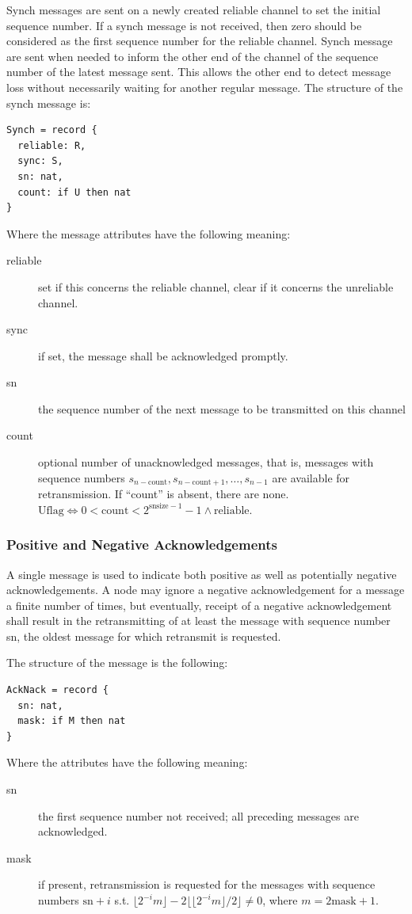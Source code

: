 \documentclass[a4paper,oneside,article]{memoir}
\begin{document}
Synch messages are sent on a newly created reliable channel to set the initial sequence number.  If
a synch message is not received, then zero should be considered as the first sequence number for the
reliable channel.  Synch message are sent when needed to inform the other end of the channel of the
sequence number of the latest message sent.  This allows the other end to detect message loss
without necessarily waiting for another regular message.  The structure of the synch message is:
\begin{verbatim}
Synch = record {
  reliable: R,
  sync: S,
  sn: nat,
  count: if U then nat
}
\end{verbatim}
Where the message attributes have the following meaning:
\begin{description}
\item[reliable] set if this concerns the reliable channel, clear if it concerns the unreliable
  channel.
\item[sync] if set, the message shall be acknowledged promptly.
\item[sn] the sequence number of the next message to be transmitted on this channel
\item[count] optional number of unacknowledged messages, that is, messages with sequence numbers
  $s_{n-\mathrm{count}}, s_{n-\mathrm{count}+1}, \ldots{}, s_{n-1}$ are available for
  retransmission.  If ``count'' is absent, there are none.
  $\mathrm{Uflag} \Leftrightarrow 0 < \mathrm{count} < 2^{\mathrm{snsize}-1}-1 \wedge
  \mathrm{reliable} $.
\end{description}

\subsubsection{Positive and Negative Acknowledgements}

A single message is used to indicate both positive as well as potentially negative acknowledgements.
A node may ignore a negative acknowledgement for a message a finite number of times, but eventually,
receipt of a negative acknowledgement shall result in the retransmitting of at least the message
with sequence number sn, the oldest message for which retransmit is requested.

The structure of the message is the following:
\begin{verbatim}
AckNack = record {
  sn: nat,
  mask: if M then nat
}
\end{verbatim}
Where the attributes have the following meaning:
\begin{description}
\item[sn] the first sequence number not received; all preceding messages are acknowledged.
\item[mask] if present, retransmission is requested for the messages
  with sequence numbers $\mathrm{sn}+i$ s.t.
  $\lfloor 2^{-i} m \rfloor - 2 \big\lfloor \lfloor 2^{-i} m \rfloor /
  2 \big\rfloor \neq 0$, where $m = 2 \mathrm{mask} + 1$.
\end{description}
\end{document}
